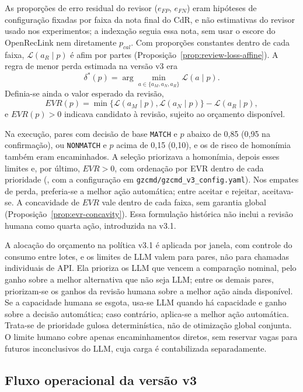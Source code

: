As proporções de erro residual do revisor ($e_{FP}$, $e_{FN}$) eram hipóteses de configuração fixadas por faixa da nota final do CdR, e não estimativas do revisor usado nos experimentos; a indexação seguia essa nota, sem usar o escore do OpenRecLink nem diretamente $p_{cal}$. Com proporções constantes dentro de cada faixa, $\mathcal{L}(a_R\mid p)$ é afim por partes (Proposição~\ref{prop:review-loss-affine}). A regra de menor perda estimada na versão v3 era
\[
\delta^*(p)=\arg\min_{a\in\{a_M,a_N,a_R\}}\mathcal{L}(a\mid p).
\]
Definia-se ainda o valor esperado da revisão,
\[
EVR(p)=\min\{\mathcal{L}(a_M\mid p),\mathcal{L}(a_N\mid p)\}-\mathcal{L}(a_R\mid p),
\]
e $EVR(p)>0$ indicava candidato à revisão, sujeito ao orçamento disponível.

Na execução, pares com decisão de base \texttt{MATCH} e $p$ abaixo de 0,85 (0,95 na confirmação), ou \texttt{NONMATCH} e $p$ acima de 0,15 (0,10), e os de risco de homonímia também eram encaminhados. A seleção priorizava a homonímia, depois esses limites e, por último, $EVR>0$, com ordenação por EVR dentro de cada prioridade (, com a configuração em \texttt{gzcmd/gzcmd\_v3\_config.yaml}). Nos empates de perda, preferia-se a melhor ação automática; entre aceitar e rejeitar, aceitava-se. A concavidade de $EVR$ vale dentro de cada faixa, sem garantia global (Proposição~\ref{prop:evr-concavity}). Essa formulação histórica não inclui a revisão humana como quarta ação, introduzida na v3.1.

A alocação do orçamento na política v3.1 é aplicada por janela, com controle do consumo entre lotes, e os limites de LLM valem para pares, não para chamadas individuais de API. Ela prioriza os LLM que vencem a comparação nominal, pelo ganho sobre a melhor alternativa que não seja LLM; entre os demais pares, priorizam-se os ganhos da revisão humana sobre a melhor ação ainda disponível. Se a capacidade humana se esgota, usa-se LLM quando há capacidade e ganho sobre a decisão automática; caso contrário, aplica-se a melhor ação automática. Trata-se de prioridade gulosa determinística, não de otimização global conjunta. O limite humano cobre apenas encaminhamentos diretos, sem reservar vagas para futuros inconclusivos do LLM, cuja carga é contabilizada separadamente.

\subsection{Fluxo operacional da versão v3}
\label{sec:e4-fluxo}


